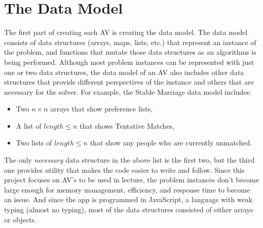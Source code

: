 \section{The Data Model}
\hspace{-0.26in}
The first part of creating each AV is creating the data model. 
The data model consists of 
data structures (arrays, maps, lists, etc.)
that represent an instance of the problem, 
and functions that mutate those data structures as an algorithms is being performed. 
Although most problem instances can be represented with just one or two data structures, 
the data model of an AV also includes other data structures that 
provide different perspectives of the instance and others that are necessary for the solver.
For example, the Stable Marriage data model includes: 
\begin{itemize}
	\item Two $n \times n$ arrays that show preference lists, 
	\item A list of $length \leq n$ that shows Tentative Matches, 
	\item Two lists of $length \leq n$ that show any people who are currently unmatched. 
\end{itemize}
The only \textit{necessary} data structure in the above list is the first two, 
but the third one provides utility that makes the code easier to write and follow.
\newline\newline
Since this project focuses on AV's to be used in lecture, 
the problem instances don't become large enough for 
memory management, efficiency, and response time 
to become an issue. 
And since the app is programmed in JavaScript, 
a language with weak typing (almost no typing), most of the data structures 
consisted of either arrays or objects.
%
